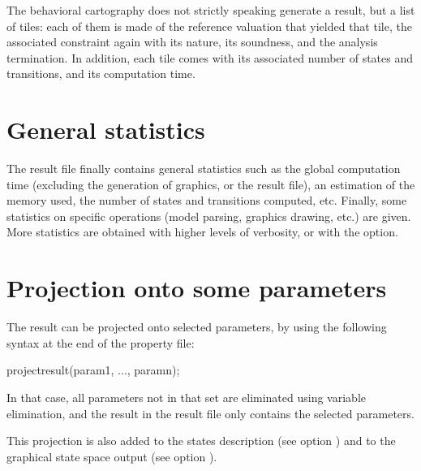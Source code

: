 The behavioral cartography does not strictly speaking generate a result, but a list of tiles: each of them is made of the reference valuation that yielded that tile, the associated constraint again with its nature, its soundness, and the analysis termination.
In addition, each tile comes with its associated number of states and transitions, and its computation time.



\section{General statistics}

The result file finally contains general statistics such as the global computation time (excluding the generation of graphics, or the result file), an estimation of the memory used, the number of states and transitions computed, etc.
Finally, some statistics on specific operations (model parsing, graphics drawing, etc.) are given.
More statistics are obtained with higher levels of verbosity, or with the  option.

\section{Projection onto some parameters}\label{section:projection}
The result can be projected onto selected parameters, by using the following syntax at the end of the property file:

\begin{IMITATORproperty}
projectresult(param1, ..., paramn);
\end{IMITATORproperty}


In that case, all parameters not in that set are eliminated using variable elimination, and the result in the result file only contains the selected parameters.

This projection is also added to the states description (see option ) and to the graphical state space output (see option ).






